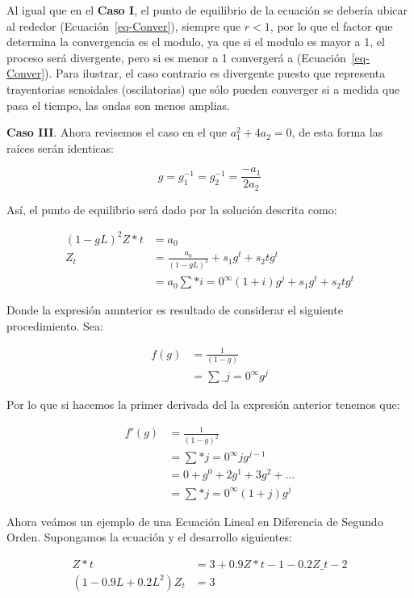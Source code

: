 \documentclass[
  a4paper,
]{article}
\begin{document}
Al igual que en el \textbf{Caso I}, el punto de equilibrio de la
ecuación se debería ubicar al rededor (Ecuación~\ref{eq-Conver}),
siempre que \(r < 1\), por lo que el factor que determina la
convergencia es el modulo, ya que si el modulo es mayor a 1, el proceso
será divergente, pero si es menor a 1 convergerá a
(Ecuación~\ref{eq-Conver}). Para ilustrar, el caso contrario es
divergente puesto que representa trayentorias senoidales (oscilatorias)
que sólo pueden converger si a medida que pasa el tiempo, las ondas son
menos amplias.

\textbf{Caso III}. Ahora revisemos el caso en el que
\(a_1^2 + 4a_2 = 0\), de esta forma las raíces serán identicas:

\[
g = g_1^{-1} = g_2^{-1} = \frac{-a_1}{2 a_2}
\]

Así, el punto de equilibrio será dado por la solución descrita como:

\begin{align}
(1 - g L)^2 Z*t & = a_0 \nonumber \\
Z_t & = \frac{a_0}{(1 - g L)^2} + s_1 g^t + s_2 t g^t \nonumber \\
& = a_0 \sum*{i = 0}^{\infty} (1 + i) g^j + s_1 g^t + s_2 t g^t
\end{align}

Donde la expresión amnterior es resultado de considerar el siguiente
procedimiento. Sea:

\begin{align}
f(g) & = \frac{1}{(1 - g)} \\
& = \sum\_{j = 0}^{\infty} g^j \nonumber
\end{align}

Por lo que si hacemos la primer derivada del la expresión anterior
tenemos que:

\begin{align}
f'(g) & = \frac{1}{(1 - g)^2} \nonumber \\
& = \sum*{j = 0}^{\infty} j g^{j-1} \nonumber \\
& = 0 + g^0 + 2 g^1 + 3 g^2 + \ldots \nonumber \\
& = \sum*{j = 0}^{\infty} (1 + j) g^j \nonumber
\end{align}

Ahora veámos un ejemplo de una Ecuación Lineal en Diferencia de Segundo
Orden. Supongamos la ecuación y el desarrollo siguientes:

\begin{align}
Z*t & = 3 + 0.9 Z*{t-1} - 0.2 Z\_{t-2} \nonumber \\
(1 - 0.9 L + 0.2 L^2) Z_t & = 3 \nonumber
\end{align}
\end{document}
